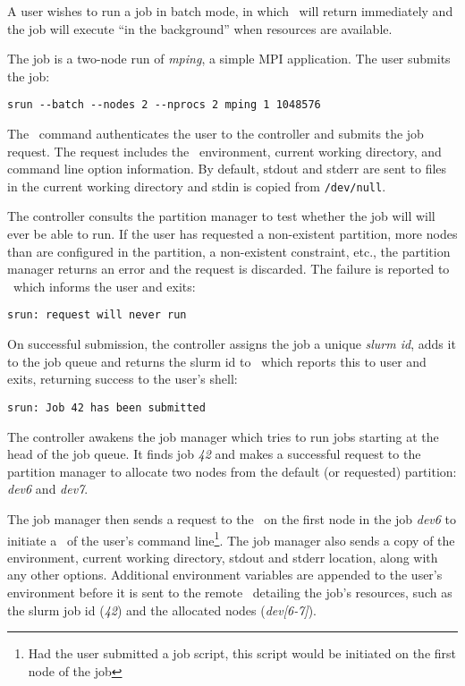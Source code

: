 A user wishes to run a job in batch mode, in which \srun\ will return 
immediately and the job will execute ``in the background'' when resources
are available.

The job is a two-node run of {\em mping}, a simple MPI application.
The user submits the job:
\begin{verbatim}
srun --batch --nodes 2 --nprocs 2 mping 1 1048576
\end{verbatim}

The \srun\ command authenticates the user to the controller and submits
the job request. 
The request includes the \srun\ environment, current working directory, 
and command line option information. By default, stdout and stderr are
sent to files in the current working directory and stdin is copied from
{\tt /dev/null}.

The controller consults the partition manager to test whether the job will
will ever be able to run.  If the user has requested a non-existent partition,
more nodes than are configured in the partition, a non-existent constraint, 
etc., the partition manager returns an error and the request is discarded.
The failure is reported to \srun\ which informs the user and exits:
\begin{verbatim}
srun: request will never run
\end{verbatim}

On successful submission, the controller assigns the job a unique 
{\em slurm id}, adds it to the job queue and returns the 
slurm id to \srun\, which reports this to user and exits, returning
success to the user's shell:

\begin{verbatim}
srun: Job 42 has been submitted
\end{verbatim}

The controller awakens the job manager which tries to run
jobs starting at the head of the job queue.  It finds job {\em 42}
and makes a successful request to the partition manager to allocate 
two nodes from the default (or requested) partition: {\em dev6} and 
{\em dev7}.

The job manager then sends a request to the \slurmd\ on the first node 
in the job {\em dev6} to initiate a \srun\ of the user's
command line\footnote{Had the user submitted a job script, this script would
be initiated on the first node of the job}. The job manager also sends a 
copy of the environment, current working directory, stdout and stderr location,
along with any other options. Additional environment variables are appended
to the user's environment before it is sent to the remote \slurmd\ detailing
the job's resources, such as the slurm job id ({\em 42}) and the
allocated nodes ({\em dev[6-7]}).

